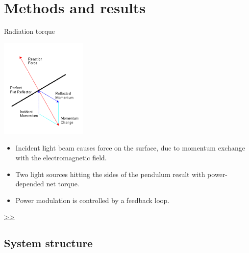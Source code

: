 \documentclass{beamer}
\begin{document}
\section{Methods and results}
\begin{frame}{\hypertarget{frame:Radiation torque}{Radiation torque}}
	\begin{center}		
		\includegraphics[width=0.32\textwidth,keepaspectratio]{radiation.PNG}
    \end{center}

	
	\begin{itemize}		
		
		\item Incident light beam causes force on the surface, due to momentum exchange with the electromagnetic field.
		\item Two light sources hitting the sides of the pendulum result with power-depended net torque.
		\item Power modulation is controlled by a feedback loop.
		
	\end{itemize}
	\hyperlink{frame:Radiation torque 1}{>>} 
\end{frame}
\subsection{System structure}
\end{document}
